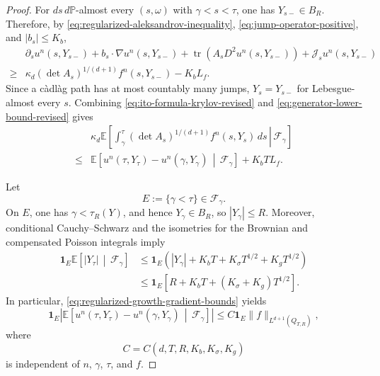 \documentclass[12pt,oneside, reqno]{amsart}
\numberwithin{equation}{section}
\begin{document}
\begin{proof}
	For \(ds\,d\mathbb P\)-almost every \((s,\omega)\) with
	\(\gamma<s<\tau\), one has \(Y_{s-}\in B_R\). Therefore, by
	\eqref{eq:regularized-aleksandrov-inequality},
	\eqref{eq:jump-operator-positive}, and \(|b_s|\leq K_b\),
	\begin{equation}
		\label{eq:generator-lower-bound-revised}
		\begin{aligned}
			&\partial_su^n(s,Y_{s-})
			+b_s\cdot\nabla u^n(s,Y_{s-})
			+\operatorname{tr}\!\left(
			A_sD^2u^n(s,Y_{s-})
			\right)
			+\mathcal J_su^n(s,Y_{s-})
			\\
			\geq&
			\kappa_d(\det A_s)^{1/(d+1)}
			f^n(s,Y_{s-})
			-K_bL_f.
		\end{aligned}
	\end{equation}
	Since a c\`adl\`ag path has at most countably many jumps,
	\(Y_s=Y_{s-}\) for Lebesgue-almost every \(s\). Combining
	\eqref{eq:ito-formula-krylov-revised} and
	\eqref{eq:generator-lower-bound-revised} gives
	\begin{equation}
		\label{eq:preliminary-weighted-bound-revised}
		\begin{aligned}
			&\kappa_d
			\mathbb E\left[
			\left.
			\int_\gamma^\tau
			(\det A_s)^{1/(d+1)}
			f^n(s,Y_s)\,ds
			\,\right|\,
			\mathcal F_\gamma
			\right]
			\\
			\leq&
			\mathbb E\left[
			u^n(\tau,Y_\tau)
			-u^n(\gamma,Y_\gamma)
			\,\middle|\,
			\mathcal F_\gamma
			\right]
			+K_bTL_f.
		\end{aligned}
	\end{equation}
	
	Let
	\[
	E:=\{\gamma<\tau\}\in\mathcal F_\gamma.
	\]
	On \(E\), one has \(\gamma<\tau_R(Y)\), and hence
	\(Y_\gamma\in B_R\), so \(|Y_\gamma|\leq R\).
	Moreover, conditional Cauchy--Schwarz and the isometries for the
	Brownian and compensated Poisson integrals imply
	\begin{equation}
		\label{eq:conditional-terminal-moment-revised}
		\begin{aligned}
			\mathbf1_E
			\mathbb E\left[
			|Y_\tau|
			\,\middle|\,
			\mathcal F_\gamma
			\right]
			&\leq
			\mathbf1_E
			\left(
			|Y_\gamma|
			+K_bT
			+K_\sigma T^{1/2}
			+K_gT^{1/2}
			\right)
			\\
			&\leq
			\mathbf1_E
			\left[
			R+K_bT
			+(K_\sigma+K_g)T^{1/2}
			\right].
		\end{aligned}
	\end{equation}
	In particular,
	\eqref{eq:regularized-growth-gradient-bounds} yields
	\begin{equation}
		\label{eq:terminal-test-function-bound-revised}
		\mathbf1_E
		\left|
		\mathbb E\left[
		u^n(\tau,Y_\tau)
		-u^n(\gamma,Y_\gamma)
		\,\middle|\,
		\mathcal F_\gamma
		\right]
		\right|
		\leq
		C\mathbf1_E
		\|f\|_{L^{d+1}(Q_{T,R})},
	\end{equation}
	where
	\[
	C=C(d,T,R,K_b,K_\sigma,K_g)
	\]
	is independent of \(n\), \(\gamma\), \(\tau\), and \(f\).
	

\end{proof}
\end{document}
